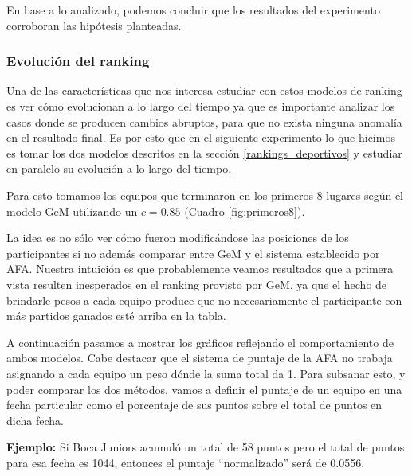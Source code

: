 En base a lo analizado, podemos concluir que los resultados del experimento corroboran
las hipótesis planteadas.

\subsubsection{Evolución del ranking}

Una de las características que nos interesa estudiar con estos modelos de
ranking es ver cómo evolucionan a lo largo del tiempo ya que es importante
analizar los casos donde se producen cambios abruptos, para que no exista
ninguna anomalía en el resultado final. Es por esto que en el siguiente
experimento lo que hicimos es tomar los dos modelos descritos en la sección \ref{rankings_deportivos}
 y estudiar en paralelo su evolución a lo largo del tiempo.

Para esto tomamos los equipos que terminaron en los primeros 8 lugares según el modelo
GeM utilizando un $c = 0.85$ (Cuadro \ref{fig:primeros8}).

La idea es no sólo ver cómo fueron modificándose las posiciones de los
participantes si no además comparar entre GeM y el sistema establecido por AFA.
Nuestra intuición es que probablemente veamos resultados que a primera vista
resulten inesperados en el ranking provisto por GeM, ya que el hecho de
brindarle pesos a cada equipo produce que no necesariamente el participante con
más partidos ganados esté arriba en la tabla.

A continuación pasamos a mostrar los gráficos reflejando el comportamiento de
ambos modelos. Cabe destacar que el sistema de puntaje de la AFA no trabaja
asignando a cada equipo un peso dónde la suma total da 1. Para subsanar esto,
y poder comparar los dos métodos, vamos a definir el puntaje de un equipo en una
fecha particular como el porcentaje de sus puntos sobre el total de puntos en dicha
fecha.

\textbf{Ejemplo:} Si Boca Juniors acumuló un total de 58 puntos pero el total de
puntos para esa fecha es 1044, entonces el puntaje ``normalizado'' será de
0.0556.

